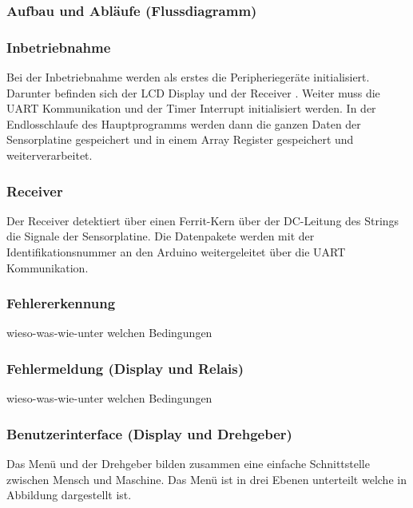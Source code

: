 \subsubsection{Aufbau und Abläufe (Flussdiagramm)}
\subsubsection{Inbetriebnahme}
Bei der Inbetriebnahme werden als erstes die Peripheriegeräte initialisiert. Darunter befinden sich der LCD Display und der Receiver . Weiter muss die UART Kommunikation und der Timer Interrupt initialisiert werden. In der Endlosschlaufe des Hauptprogramms werden dann die ganzen Daten der Sensorplatine gespeichert und in einem Array Register gespeichert und weiterverarbeitet.
\subsubsection{Receiver}
Der Receiver detektiert über einen Ferrit-Kern über der DC-Leitung des Strings die Signale der Sensorplatine. Die Datenpakete werden mit der Identifikationsnummer an den Arduino weitergeleitet über die UART Kommunikation.
\subsubsection{Fehlererkennung}
wieso-was-wie-unter welchen Bedingungen
\subsubsection{Fehlermeldung (Display und Relais)}
wieso-was-wie-unter welchen Bedingungen
\subsubsection{Benutzerinterface (Display und Drehgeber)}
Das Menü und der Drehgeber bilden zusammen eine einfache Schnittstelle zwischen Mensch und Maschine. Das Menü ist in drei Ebenen unterteilt welche in Abbildung  dargestellt ist.